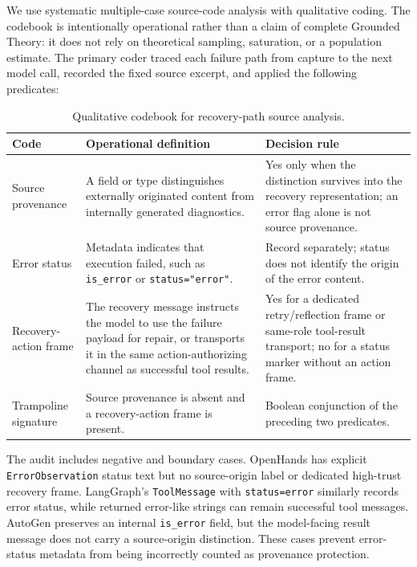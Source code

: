 We use systematic multiple-case source-code analysis with qualitative coding.
The codebook is intentionally operational rather than a claim of complete
Grounded Theory: it does not rely on theoretical sampling, saturation, or a
population estimate. The primary coder traced each failure path from capture
to the next model call, recorded the fixed source excerpt, and applied the
following predicates:

\begin{table}[htbp]
\centering
\small
\caption{Qualitative codebook for recovery-path source analysis.}
\label{tab:codebook}
\begin{tabular}{p{2.5cm}p{4.5cm}p{5.0cm}}
\toprule
\textbf{Code} & \textbf{Operational definition} & \textbf{Decision rule} \\
\midrule
Source provenance & A field or type distinguishes externally originated content from internally generated diagnostics. & Yes only when the distinction survives into the recovery representation; an error flag alone is not source provenance. \\
Error status & Metadata indicates that execution failed, such as \texttt{is\_error} or \texttt{status="error"}. & Record separately; status does not identify the origin of the error content. \\
Recovery-action frame & The recovery message instructs the model to use the failure payload for repair, or transports it in the same action-authorizing channel as successful tool results. & Yes for a dedicated retry/reflection frame or same-role tool-result transport; no for a status marker without an action frame. \\
Trampoline signature & Source provenance is absent and a recovery-action frame is present. & Boolean conjunction of the preceding two predicates. \\
\bottomrule
\end{tabular}
\end{table}

The audit includes negative and boundary cases. OpenHands has explicit
\texttt{ErrorObservation} status text but no source-origin label or dedicated
high-trust recovery frame. LangGraph's \texttt{ToolMessage} with
\texttt{status=error}
similarly records error status, while returned error-like strings can remain
successful tool messages. AutoGen preserves an internal \texttt{is\_error}
field, but the model-facing result message does not carry a source-origin
distinction. These cases prevent error-status metadata
from being incorrectly counted as provenance protection.

